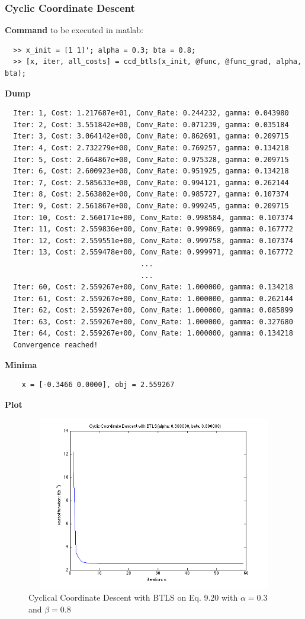 \documentclass[11pt,a4paper]{article}
\begin{document}
\newpage
\subsubsection{Cyclic Coordinate Descent}
{\bf Command} to be executed in matlab:
\begin{verbatim}
  >> x_init = [1 1]'; alpha = 0.3; bta = 0.8;
  >> [x, iter, all_costs] = ccd_btls(x_init, @func, @func_grad, alpha, bta);
\end{verbatim}
{\bf Dump}
\begin{verbatim}
  Iter: 1, Cost: 1.217687e+01, Conv_Rate: 0.244232, gamma: 0.043980
  Iter: 2, Cost: 3.551842e+00, Conv_Rate: 0.071239, gamma: 0.035184
  Iter: 3, Cost: 3.064142e+00, Conv_Rate: 0.862691, gamma: 0.209715
  Iter: 4, Cost: 2.732279e+00, Conv_Rate: 0.769257, gamma: 0.134218
  Iter: 5, Cost: 2.664867e+00, Conv_Rate: 0.975328, gamma: 0.209715
  Iter: 6, Cost: 2.600923e+00, Conv_Rate: 0.951925, gamma: 0.134218
  Iter: 7, Cost: 2.585633e+00, Conv_Rate: 0.994121, gamma: 0.262144
  Iter: 8, Cost: 2.563802e+00, Conv_Rate: 0.985727, gamma: 0.107374
  Iter: 9, Cost: 2.561867e+00, Conv_Rate: 0.999245, gamma: 0.209715
  Iter: 10, Cost: 2.560171e+00, Conv_Rate: 0.998584, gamma: 0.107374
  Iter: 11, Cost: 2.559836e+00, Conv_Rate: 0.999869, gamma: 0.167772
  Iter: 12, Cost: 2.559551e+00, Conv_Rate: 0.999758, gamma: 0.107374
  Iter: 13, Cost: 2.559478e+00, Conv_Rate: 0.999971, gamma: 0.167772
                                ...
                                ...
  Iter: 60, Cost: 2.559267e+00, Conv_Rate: 1.000000, gamma: 0.134218
  Iter: 61, Cost: 2.559267e+00, Conv_Rate: 1.000000, gamma: 0.262144
  Iter: 62, Cost: 2.559267e+00, Conv_Rate: 1.000000, gamma: 0.085899
  Iter: 63, Cost: 2.559267e+00, Conv_Rate: 1.000000, gamma: 0.327680
  Iter: 64, Cost: 2.559267e+00, Conv_Rate: 1.000000, gamma: 0.134218
  Convergence reached!
\end{verbatim}
{\bf Minima}
\begin{verbatim}
    x = [-0.3466 0.0000], obj = 2.559267 
   \end{verbatim}
{\bf Plot}
\begin{figure}[h]
    \centering
    \includegraphics[width=5in,height=3in]{../ps2_matlab/4.png}
    \caption{Cyclical Coordinate Descent with BTLS on
        Eq. 9.20 with $\alpha = 0.3$ and $\beta = 0.8$}
\end{figure}
\newpage
\end{document}
